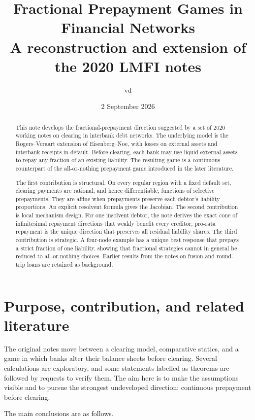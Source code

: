 \documentclass[11pt]{article}
\title{Fractional Prepayment Games in Financial Networks\\
\large A reconstruction and extension of the 2020 LMFI notes}
\author{vd}
\date{2 September 2026}
\theoremstyle{definition}
\theoremstyle{remark}
\begin{document}
\maketitle

\begin{abstract}
This note develops the fractional-prepayment direction suggested by a set of
2020 working notes on clearing in interbank debt networks.  The underlying
model is the Rogers--Veraart extension of Eisenberg--Noe, with losses on
external assets and interbank receipts in default.  Before clearing, each bank
may use liquid external assets to repay any fraction of an existing liability.
The resulting game is a continuous counterpart of the all-or-nothing
prepayment game introduced in the later literature.

The first contribution is structural.  On every regular region with a fixed
default set, clearing payments are rational, and hence differentiable,
functions of selective prepayments.  They are affine when prepayments preserve
each debtor's liability proportions.  An explicit resolvent formula gives the
Jacobian.  The second contribution is local mechanism design.  For one
insolvent debtor, the note derives the exact cone of infinitesimal repayment
directions that weakly benefit every creditor; pro-rata repayment is the unique
direction that preserves all residual liability shares.  The third
contribution is strategic.  A four-node example has a unique best response that
prepays a strict fraction of one liability, showing that fractional strategies
cannot in general be reduced to all-or-nothing choices.  Earlier results from
the notes on fusion and round-trip loans are retained as background.
\end{abstract}

\tableofcontents

\section{Purpose, contribution, and related literature}

The original notes move between a clearing model, comparative statics, and a
game in which banks alter their balance sheets before clearing.  Several
calculations are exploratory, and some statements labelled as theorems are
followed by requests to verify them.  The aim here is to make the assumptions
visible and to pursue the strongest undeveloped direction: continuous
prepayment before clearing.

The main conclusions are as follows.
\end{document}

